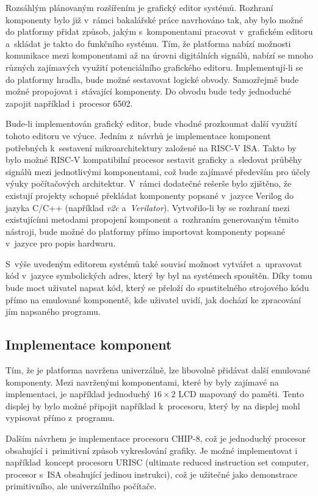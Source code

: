 Rozsáhlým plánovaným rozšířením je grafický editor systémů. Rozhraní komponenty bylo již v~rámci bakalářské práce navrhováno tak, aby bylo možné do platformy přidat způsob, jakým s~komponentami pracovat v~grafickém editoru a~skládat je takto do funkčního systému. Tím, že platforma nabízí možnosti komunikace mezi komponentami až na úrovni digitálních signálů, nabízí se mnoho různých zajímavých využití potenciálního grafického editoru. Implementují-li se do platformy hradla, bude možné sestavovat logické obvody. Samozřejmě bude možné propojovat i~stávající komponenty. Do obvodu bude tedy jednoduché zapojit například i~procesor 6502. 

Bude-li implementován grafický editor, bude vhodné prozkoumat další využití tohoto editoru ve výuce. Jedním z~návrhů je implementace komponent potřebných k~sestavení mikroarchitektury založené na RISC-V ISA. Takto by bylo možné RISC-V kompatibilní procesor sestavit graficky a~sledovat průběhy signálů mezi jednotlivými komponentami, což bude zajímavé především pro účely výuky počítačových architektur. V~rámci dodatečné rešerše bylo zjištěno, že existují projekty schopné překládat komponenty popsané v~jazyce Verilog do jazyka C/C++ (například \emph{v2c} a~\emph{Verilator}). Vytvořilo-li by se rozhraní mezi existujícími metodami propojení komponent a~rozhraním generovaným těmito nástroji, bude možné do platformy přímo importovat komponenty popsané v~jazyce pro popis hardwaru.

S~výše uvedeným editorem systémů také souvisí možnost vytvářet a~upravovat kód v~jazyce symbolických adres, který by byl na systémech spouštěn. Díky tomu bude moct uživatel napsat kód, který se přeloží do spustitelného strojového kódu přímo na emulované komponentě, kde uživatel uvidí, jak dochází ke zpracování jím napsaného programu.

\subsection{Implementace komponent}
Tím, že je platforma navržena univerzálně, lze libovolně přidávat další emulované komponenty. Mezi navrženými komponentami, které by byly zajímavé na implementaci, je například jednoduchý $16 \times 2$ LCD mapovaný do paměti. Tento displej by bylo možné připojit například k~procesoru, který by na displej mohl vypisovat přímo z~programu.

Dalším návrhem je implementace procesoru CHIP-8, což je jednoduchý procesor obsahující i~primitivní způsob vykreslování grafiky. Je možné implementovat i například~koncept procesoru URISC (ultimate reduced instruction set computer, procesor s~ISA obsahující jedinou instrukci), což je užitečné jako demonstrace primitivního, ale univerzálního počítače.


